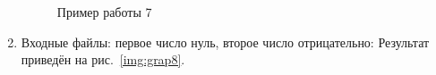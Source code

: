 \documentclass[12pt, a4paper]{article}
\begin{document}
\begin{enumerate}
\begin{figure}[h]
  		\caption{Пример работы 7}
  		\label{img:grap7}
	\end{figure}
	\item Входные файлы: первое число нуль, второе число отрицательно:
	Результат приведён на рис.~\ref{img:grap8}.
	\begin{figure}[h]

\end{figure}
\end{enumerate}
\end{document}
